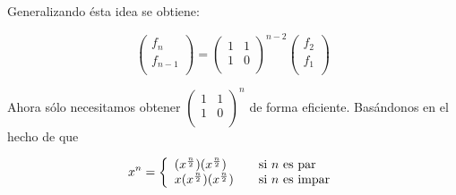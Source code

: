 \documentclass[12pt]{article}
\begin{document}
Generalizando ésta idea se obtiene:

$$
 \begin{pmatrix}
  f_n \\
  f_{n-1} \\
 \end{pmatrix}
 =
 \begin{pmatrix}
  1 & 1 \\
  1 & 0 \\
 \end{pmatrix}^{n-2}
 \begin{pmatrix}
  f_2 \\
  f_1 \\
 \end{pmatrix}
$$

Ahora sólo necesitamos obtener 
$\begin{pmatrix}
  1 & 1 \\
  1 & 0 \\
 \end{pmatrix}^n$ de forma eficiente. Basándonos en el hecho de que
 
 $$
 x^n = \left\{ 
  \begin{array}{l l}
    (x^{n \over 2})(x^{n \over 2}) & \quad \text{si $n$ es par}\\
    x(x^{n \over 2})(x^{n \over 2}) & \quad \text{si $n$ es impar}
  \end{array} \right.
$$
\end{document}
